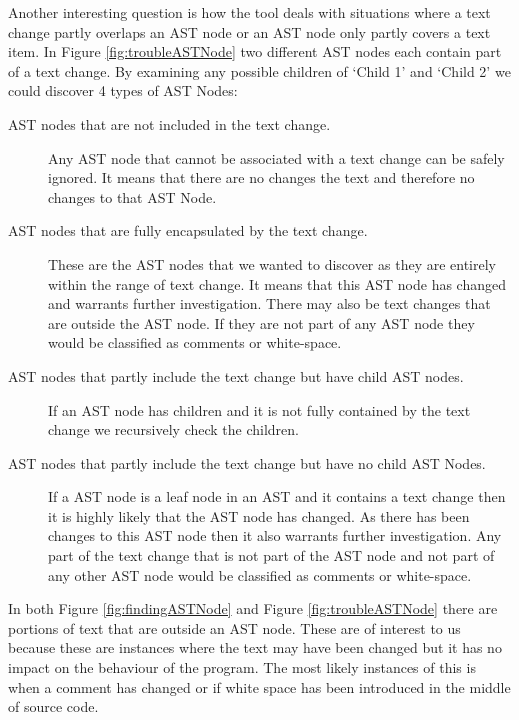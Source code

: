 Another interesting question is how the tool deals with situations where a text change partly overlaps an AST node or an AST node only partly covers a text item.  
In Figure \ref{fig:troubleASTNode} two different AST nodes each contain part of a text change. 
By examining any possible children of `Child 1' and `Child 2' we could discover 4 types of AST Nodes:
\begin{description}

  \item [AST nodes that are not included in the text change.]
    Any AST node that cannot be associated with a text change can be safely ignored. 
    It means that there are no changes the text and therefore no changes to that AST Node.
  \item [AST nodes that are fully encapsulated by the text change.] 
    These are the AST nodes that we wanted to discover as they are entirely within the range of text change.
    It means that this AST node has changed and warrants further investigation. 
    There may also be text changes that are outside the AST node.
    If they are not part of any AST node they would be classified as comments or white-space. 
  \item [AST nodes that partly include the text change but have child AST nodes.]
    If an AST node has children and it is not fully contained by the text change we recursively check the children.
  \item [AST nodes that partly include the text change but have no child AST Nodes.]
    If a AST node is a leaf node in an AST and it contains a text change then it is highly likely that the AST node has changed.
    As there has been changes to this AST node then it also warrants further investigation. 
    Any part of the text change that is not part of the AST node and not part of any other AST node would be classified as comments or white-space.    
\end{description}

In both Figure \ref{fig:findingASTNode} and Figure \ref{fig:troubleASTNode} there are portions of text that are outside an AST node.  These are of interest to us because these are instances where the text may have been changed but it has no impact on the behaviour of the program.  The most likely instances of this is when a comment has changed or if white space has been introduced in the middle of source code.

% 


